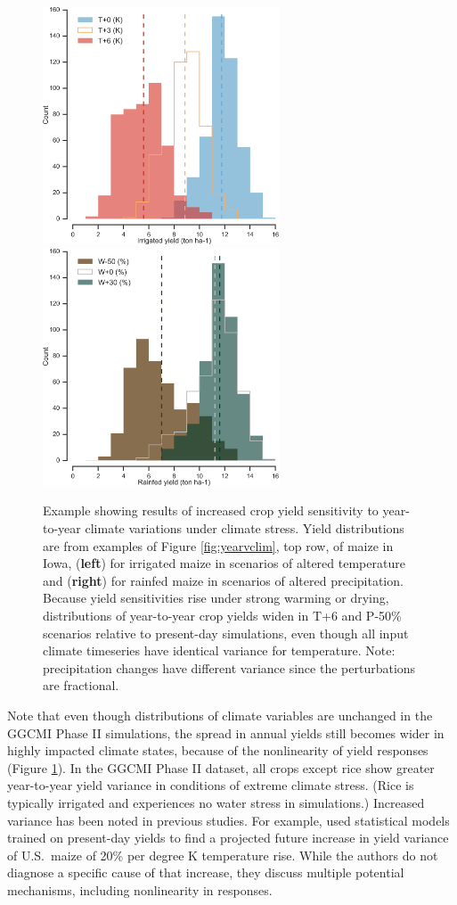 \documentclass[gmd, manuscript]{copernicus} %
\begin{document}
\begin{figure}[ht]
\centering
   \includegraphics[width=7cm]{figures/hist_year_t.png} \hspace{10mm} \includegraphics[width=7cm]{figures/hist_year_pr.png}
   \caption{
   Example showing results of increased crop yield sensitivity to year-to-year climate variations under climate stress. 
   Yield distributions are from examples of Figure \ref{fig:yearvclim}, top row, of maize in Iowa, (\textbf{left}) for irrigated maize in scenarios of altered temperature and (\textbf{right}) for rainfed maize in scenarios of altered precipitation.
   Because yield sensitivities rise under strong warming or drying, distributions of year-to-year crop yields widen in T+6  and P-50\% scenarios relative to present-day simulations, even though all input climate timeseries have identical variance for temperature. Note: precipitation changes have different variance since the perturbations are fractional.  
    }
   \label{fig:yearly}
\end{figure}

Note that even though distributions of climate variables are unchanged in the GGCMI Phase II simulations, the spread in annual yields still becomes wider in highly impacted climate states, because of the nonlinearity of yield responses (Figure \ref{fig:yearly}). 
In the GGCMI Phase II dataset, all crops except rice show  greater year-to-year yield variance in conditions of extreme climate stress.
(Rice is typically irrigated and experiences no water stress in simulations.) 
Increased variance has been noted in previous studies. 
For example, \citet{Urban2012} used statistical models trained on present-day yields to find a projected future increase in yield variance of U.S.\ maize of 20\% per degree K temperature rise. While the authors do not diagnose a specific cause of that increase, they discuss multiple potential mechanisms, including nonlinearity in responses. 
\end{document}
